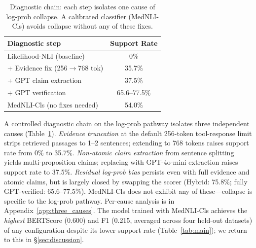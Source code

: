 \documentclass[11pt]{article}
\begin{document}
\begin{table}[t]
\centering\small
\begin{tabular}{@{}lc@{}}
\toprule
\textbf{Diagnostic step} & \textbf{Support Rate} \\
\midrule
Likelihood-NLI (baseline) & 0\% \\
\quad + Evidence fix (256$\to$768 tok) & 35.7\% \\
\quad\quad + GPT claim extraction & 37.5\% \\
\quad\quad\quad + GPT verification & 65.6--77.5\% \\
\midrule
MedNLI-Cls (no fixes needed) & 54.0\% \\
\bottomrule
\end{tabular}
\caption{Diagnostic chain: each step isolates one 
cause of log-prob collapse. A calibrated classifier 
(MedNLI-Cls) avoids collapse without any of these 
fixes.}
\label{tab:diagnosis}
\end{table}
A controlled diagnostic chain on the log-prob pathway isolates three independent causes (Table~\ref{tab:diagnosis}). \textit{Evidence truncation} at the default 256-token tool-response limit strips retrieved passages to 1--2 sentences; extending to 768 tokens raises support rate from 0\% to 35.7\%. \textit{Non-atomic claim extraction} from sentence splitting yields multi-proposition claims; replacing with GPT-4o-mini extraction raises support rate to 37.5\%. \textit{Residual log-prob bias} persists even with full evidence and atomic claims, but is largely closed by swapping the scorer (Hybrid: 75.8\%; fully GPT-verified: 65.6--77.5\%). MedNLI-Cls does not exhibit any of these---collapse is specific to the log-prob pathway. Per-cause analysis is in Appendix~\ref{app:three_causes}. The model trained with MedNLI-Cls achieves the \emph{highest} BERTScore (0.600) and F1 (0.215, averaged across four held-out datasets) of any configuration despite its lower support rate (Table~\ref{tab:main}); we return to this in \S\ref{sec:discussion}.


\end{document}
